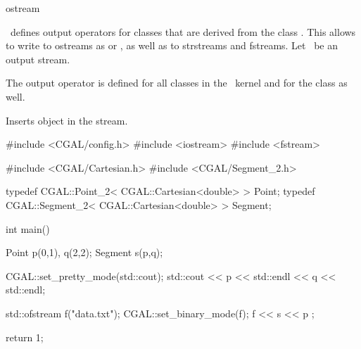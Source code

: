 \begin{ccClass} {ostream}

\ccDefinition
\cgal\  defines output operators for classes that are derived
from the class . This allows to write to ostreams
as  or , as well as to strstreams
and fstreams. Let \ccVar\  be an output stream.

\ccOperations
The output operator is defined for all classes in the \cgal\ kernel and for the class  as well.

{Inserts object  in the stream. }


\ccExample

\begin{cprog}

#include <CGAL/config.h>
#include <iostream>
#include <fstream>

#include <CGAL/Cartesian.h>
#include <CGAL/Segment_2.h>

typedef CGAL::Point_2< CGAL::Cartesian<double> >     Point;
typedef CGAL::Segment_2< CGAL::Cartesian<double> >   Segment;

int main()
{
    Point p(0,1), q(2,2);
    Segment s(p,q);

    CGAL::set_pretty_mode(std::cout);
    std::cout << p << std::endl << q  << std::endl;

    std::ofstream f("data.txt");
    CGAL::set_binary_mode(f);
    f << s << p ;

    return 1;
}
\end{cprog} 
\end{ccClass} 


